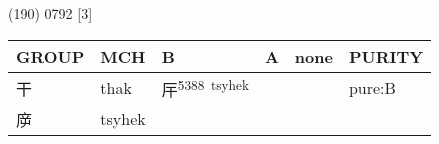 \documentclass[14pt,a4paper]{scrartcl}
\begin{document}
(190) 0792 {[}3{]}

\begin{longtable}[c]{@{}llllll@{}}
\toprule
\begin{minipage}[b]{0.14\columnwidth}\raggedright\strut
GROUP
\strut\end{minipage} &
\begin{minipage}[b]{0.14\columnwidth}\raggedright\strut
MCH
\strut\end{minipage} &
\begin{minipage}[b]{0.14\columnwidth}\raggedright\strut
B
\strut\end{minipage} &
\begin{minipage}[b]{0.14\columnwidth}\raggedright\strut
A
\strut\end{minipage} &
\begin{minipage}[b]{0.14\columnwidth}\raggedright\strut
none
\strut\end{minipage} &
\begin{minipage}[b]{0.14\columnwidth}\raggedright\strut
PURITY
\strut\end{minipage}\tabularnewline
\midrule
\endhead
\begin{minipage}[t]{0.14\columnwidth}\raggedright\strut
干
\strut\end{minipage} &
\begin{minipage}[t]{0.14\columnwidth}\raggedright\strut
thak
\strut\end{minipage} &
\begin{minipage}[t]{0.14\columnwidth}\raggedright\strut
厈\textsuperscript{5388~tsyhek}
\strut\end{minipage} &
\begin{minipage}[t]{0.14\columnwidth}\raggedright\strut
\strut\end{minipage} &
\begin{minipage}[t]{0.14\columnwidth}\raggedright\strut
\strut\end{minipage} &
\begin{minipage}[t]{0.14\columnwidth}\raggedright\strut
pure:B
\strut\end{minipage}\tabularnewline
\begin{minipage}[t]{0.14\columnwidth}\raggedright\strut
㡿
\strut\end{minipage} &
\begin{minipage}[t]{0.14\columnwidth}\raggedright\strut
tsyhek
\strut\end{minipage} &
\begin{minipage}[t]{0.14\columnwidth}\raggedright\strut
\strut\end{minipage} &

\end{longtable}
\end{document}
